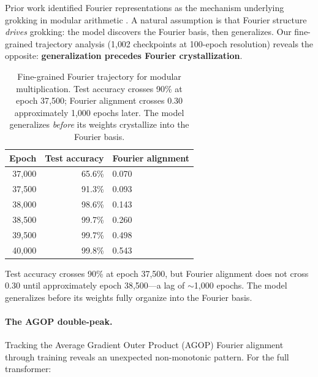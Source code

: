 \documentclass{article}
\begin{document}
Prior work identified Fourier representations as the mechanism underlying
grokking in modular arithmetic \citep{nanda2023progress, zhong2024clock}.
A natural assumption is that Fourier structure \emph{drives} grokking:
the model discovers the Fourier basis, then generalizes. Our fine-grained
trajectory analysis (1{,}002 checkpoints at 100-epoch resolution) reveals
the opposite: \textbf{generalization precedes Fourier crystallization}.

\begin{table}[t]
\centering
\small
\begin{tabular}{rrl}
\toprule
Epoch & Test accuracy & Fourier alignment \\
\midrule
37{,}000 & 65.6\% & 0.070 \\
37{,}500 & 91.3\% & 0.093 \\
38{,}000 & 98.6\% & 0.143 \\
38{,}500 & 99.7\% & 0.260 \\
39{,}500 & 99.7\% & 0.498 \\
40{,}000 & 99.8\% & 0.543 \\
\bottomrule
\end{tabular}
\caption{Fine-grained Fourier trajectory for modular multiplication.
Test accuracy crosses 90\% at epoch 37{,}500; Fourier alignment crosses 0.30
approximately 1{,}000 epochs later. The model generalizes \emph{before} its
weights crystallize into the Fourier basis.}
\label{tab:fourier_lag}
\end{table}

Test accuracy crosses 90\% at epoch 37{,}500, but Fourier alignment does not
cross 0.30 until approximately epoch 38{,}500---a lag of $\sim$1{,}000
epochs. The model generalizes before its weights fully organize into the
Fourier basis.

\paragraph{The AGOP double-peak.}
Tracking the Average Gradient Outer Product (AGOP) Fourier alignment through
training reveals an unexpected non-monotonic pattern. For the full transformer:
\end{document}
